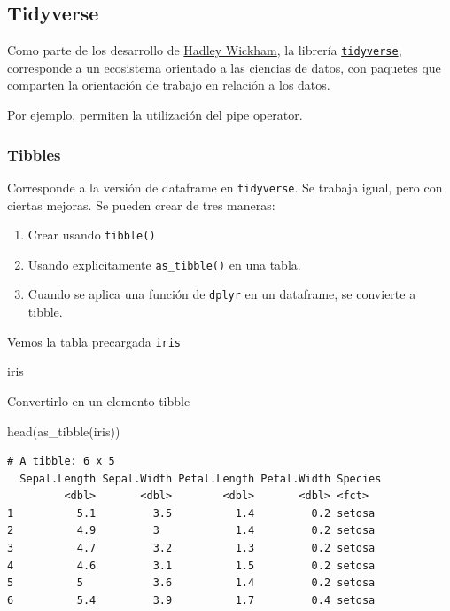 \documentclass[
  letterpaper,
  DIV=11,
  numbers=noendperiod]{scrartcl}
\newenvironment{Shaded}{\begin{snugshade}}{\end{snugshade}}
\newcommand{\FunctionTok}[1]{\textcolor[rgb]{0.28,0.35,0.67}{#1}}
\newcommand{\NormalTok}[1]{\textcolor[rgb]{0.00,0.23,0.31}{#1}}
\providecommand{\tightlist}{%
  \setlength{\itemsep}{0pt}\setlength{\parskip}{0pt}}
\begin{document}
\subsection{Tidyverse}\label{tidyverse-1}

Como parte de los desarrollo de \href{http://hadley.nz/}{Hadley
Wickham}, la librería
\href{https://www.tidyverse.org/}{\texttt{tidyverse}}, corresponde a un
ecosistema orientado a las ciencias de datos, con paquetes que comparten
la orientación de trabajo en relación a los datos.

Por ejemplo, permiten la utilización del pipe operator.

\subsubsection{Tibbles}\label{tibbles}

Corresponde a la versión de dataframe en \texttt{tidyverse}. Se trabaja
igual, pero con ciertas mejoras. Se pueden crear de tres maneras:

\begin{enumerate}
\def\labelenumi{\arabic{enumi}.}
\tightlist
\item
  Crear usando \texttt{tibble()}
\item
  Usando explicitamente \texttt{as\_tibble()} en una tabla.
\item
  Cuando se aplica una función de \texttt{dplyr} en un dataframe, se
  convierte a tibble.
\end{enumerate}

Vemos la tabla precargada \texttt{iris}

\begin{Shaded}
\begin{Highlighting}[]
\NormalTok{iris}
\end{Highlighting}
\end{Shaded}

Convertirlo en un elemento tibble

\begin{Shaded}
\begin{Highlighting}[]
\FunctionTok{head}\NormalTok{(}\FunctionTok{as\_tibble}\NormalTok{(iris))}
\end{Highlighting}
\end{Shaded}

\begin{verbatim}
# A tibble: 6 x 5
  Sepal.Length Sepal.Width Petal.Length Petal.Width Species
         <dbl>       <dbl>        <dbl>       <dbl> <fct>  
1          5.1         3.5          1.4         0.2 setosa 
2          4.9         3            1.4         0.2 setosa 
3          4.7         3.2          1.3         0.2 setosa 
4          4.6         3.1          1.5         0.2 setosa 
5          5           3.6          1.4         0.2 setosa 
6          5.4         3.9          1.7         0.4 setosa 
\end{verbatim}
\end{document}
